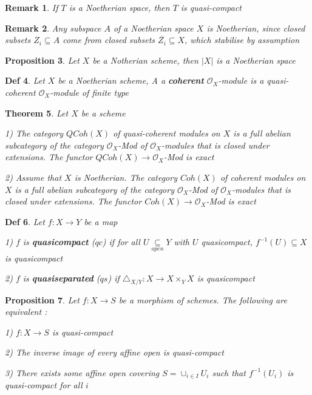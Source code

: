 \documentclass{article}
\newtheorem{theorem}{Theorem}[section]
\newtheorem{definition}[theorem]{Def}
\newtheorem{proposition}[theorem]{Proposition}
\newtheorem{remark}[theorem]{Remark}
\begin{document}
\begin{remark}
    If $T$ is a Noetherian space, then $T$ is quasi-compact
\end{remark}

\begin{remark}
    Any subspace $A$ of a Noetherian space $X$ is Noetherian, since closed subsets $Z_i \subseteq A$ come from closed subsets $\overline{Z_i} \subseteq X$, which stabilise by assumption
\end{remark}

\begin{proposition}
    Let $X$ be a Notherian scheme, then $|X|$ is a Noetherian space
\end{proposition}

\begin{definition}
    Let $X$ be a Noetherian scheme, A a \textbf{coherent} $\mathcal O_X$-module is a quasi-coherent $\mathcal O_X$-module of finite type
\end{definition}

\begin{theorem}
    Let $X$ be a scheme
    
1) The category $QCoh(X)$ of quasi-coherent modules on $X$ is a full abelian subcategory
of the category $\mathcal O_X$-Mod of $\mathcal O_X$-modules that is closed under extensions. The functor
$QCoh(X) \to\mathcal O_X$-Mod is exact

2) Assume that $X$ is Noetherian. 
The category $Coh(X)$ of coherent modules on $X$ is a full abelian subcategory
of the category $\mathcal O_X$-Mod of $\mathcal O_X$-modules that is closed under extensions. The functor
$Coh(X) \to\mathcal O_X$-Mod is exact
\end{theorem}

\begin{definition}
    Let $f:X\to Y$ be a map

    1) $f$ is \textbf{quasicompact} ($qc$) if for all $U\mathop{\subseteq}\limits_{open} Y$ with $U$ quasicompact, $f^{-1}(U)\subseteq X$ is quasicompact

    2) $f$ is \textbf{quasiseparated} ($qs$) if $\triangle_{X/Y}:X\to X\times_Y X$ is quasicompact
\end{definition}

\begin{proposition}
    Let $f:X\to S$ be a morphism of schemes. The following are equivalent :

1) $f:X\to S$ is quasi-compact

2) The inverse image of every affine open is quasi-compact

3) There exists some affine open covering $S=\cup_{i\in I}U_i$ such that $f^{-1}(U_i)$ is quasi-compact for all $i$
\end{proposition}
\end{document}
